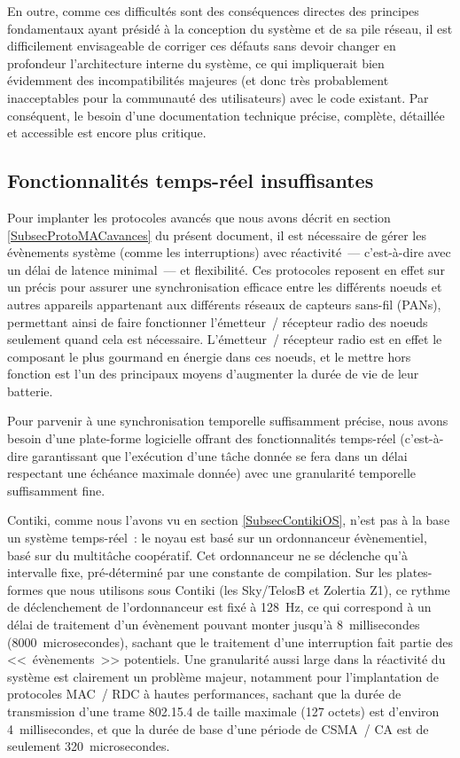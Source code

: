 \bigskip

En outre, comme ces difficultés sont des conséquences directes des principes
fondamentaux ayant présidé à la conception du système et de sa pile réseau,
il est difficilement envisageable de corriger ces défauts sans devoir
changer en profondeur l'architecture interne du système, ce qui
impliquerait bien évidemment des incompatibilités majeures (et donc
très probablement inacceptables pour la communauté des utilisateurs)
avec le code existant. Par conséquent, le besoin d'une documentation
technique précise, complète, détaillée et accessible est encore plus
critique.


\subsection{Fonctionnalités temps-réel insuffisantes}
\label{SubsecContikiTempsReel}

Pour implanter les protocoles avancés que nous avons décrit en section
\vref{SubsecProtoMACavances} du présent document, il est nécessaire de
gérer les évènements système (comme les interruptions) avec réactivité~---
c'est-à-dire avec un délai de latence minimal~--- et flexibilité. Ces
protocoles reposent en effet sur un  précis pour assurer
une synchronisation efficace entre les différents noeuds et autres
appareils appartenant aux différents réseaux de capteurs sans-fil (PANs),
permettant ainsi de faire fonctionner l'émetteur~/ récepteur radio des
noeuds seulement quand cela est nécessaire. L'émetteur~/ récepteur radio
est en effet le composant le plus gourmand en énergie dans ces noeuds,
et le mettre hors fonction est l'un des principaux moyens d'augmenter
la durée de vie de leur batterie.

Pour parvenir à une synchronisation temporelle suffisamment précise, nous
avons besoin d'une plate-forme logicielle offrant des fonctionnalités
temps-réel (c'est-à-dire garantissant que l'exécution d'une tâche donnée
se fera dans un délai respectant une échéance maximale donnée) avec une
granularité temporelle suffisamment fine.

Contiki, comme nous l'avons vu en section \vref{SubsecContikiOS}, n'est
pas à la base un système temps-réel~: le noyau est basé sur un ordonnanceur
évènementiel, basé sur du multitâche coopératif. Cet ordonnanceur ne se
déclenche qu'à intervalle fixe, pré-déterminé par une constante de
compilation. Sur les plates-formes que nous utilisons sous Contiki (les
 Sky/TelosB et Zolertia Z1), ce rythme de déclenchement de
l'ordonnanceur est fixé à 128~Hz, ce qui correspond à un délai de traitement
d'un évènement pouvant monter jusqu'à 8~millisecondes (8000~microsecondes),
sachant que le traitement d'une interruption fait partie des <<~évènements~>>
potentiels. Une granularité aussi large dans la réactivité du système est
clairement un problème majeur, notamment pour l'implantation de protocoles
MAC~/ RDC à hautes performances, sachant que la durée de transmission d'une
trame 802.15.4 de taille maximale (127 octets) est d'environ 4~millisecondes,
et que la durée de base d'une période de  CSMA~/ CA est de
seulement 320~microsecondes.

